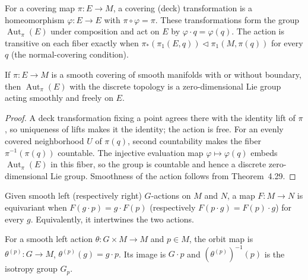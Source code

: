 \begin{definition}
\label{def:7-50-extra-2}
\leanok
For a covering map $\pi:E\to M$, a covering (deck) transformation is a
homeomorphism $\varphi:E\to E$ with $\pi\circ\varphi=\pi$. These transformations
form the group $\operatorname{Aut}_\pi(E)$ under composition and act on $E$ by
$\varphi\cdot q=\varphi(q)$. The action is transitive on each fiber exactly
when $\pi_*(\pi_1(E,q))\triangleleft\pi_1(M,\pi(q))$ for every $q$ (the
normal-covering condition).
\end{definition}

\begin{proposition}
\label{prop:7-23}
\leanok
{}
If $\pi:E\to M$ is a smooth covering of smooth manifolds with or without
boundary, then $\operatorname{Aut}_\pi(E)$ with the discrete topology is a
zero-dimensional Lie group acting smoothly and freely on $E$.
\end{proposition}

\begin{proof}
\leanok
\sketch A deck transformation fixing a point agrees there with the identity lift of $\pi$, so uniqueness of lifts makes it the identity; the action is free. For an evenly covered neighborhood $U$ of $\pi(q)$, second countability makes the fiber $\pi^{-1}(\pi(q))$ countable. The injective evaluation map $\varphi\mapsto\varphi(q)$ embeds $\operatorname{Aut}_\pi(E)$ in this fiber, so the group is countable and hence a discrete zero-dimensional Lie group. Smoothness of the action follows from Theorem~4.29.
\end{proof}

\begin{definition}
\label{def:7-50-extra-3}
\mathlibok
Given smooth left (respectively right) $G$-actions on $M$ and $N$, a map $F:M\to N$ is equivariant when $F(g\cdot p)=g\cdot F(p)$ (respectively $F(p\cdot g)=F(p)\cdot g$) for every $g$. Equivalently, it intertwines the two actions.
\end{definition}

\begin{definition}
\label{def:7-50-extra-4}
\leanok
For a smooth left action $\theta:G\times M\to M$ and $p\in M$, the orbit map is $\theta^{(p)}:G\to M$, $\theta^{(p)}(g)=g\cdot p$. Its image is $G\cdot p$ and $(\theta^{(p)})^{-1}(p)$ is the isotropy group $G_p$.
\end{definition}

